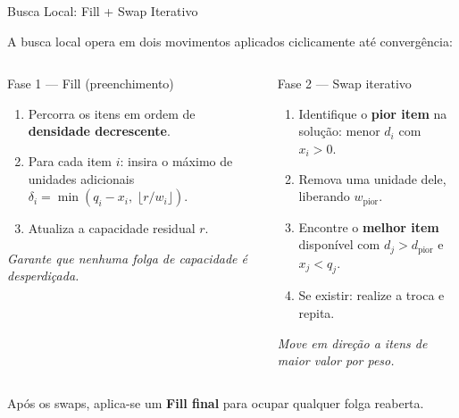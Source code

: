 \documentclass[aspectratio=169]{beamer}
\begin{document}
\begin{frame}{Busca Local: Fill + Swap Iterativo}

  A busca local opera em dois movimentos aplicados ciclicamente até convergência:

  \vspace{0.5em}
  \begin{columns}[T]
      \begin{block}{Fase 1 — Fill (preenchimento)}
        \begin{enumerate}
          \item Percorra os itens em ordem de \textbf{densidade decrescente}.
          \item Para cada item $i$: insira o máximo de unidades adicionais
                $\delta_i = \min(q_i - x_i,\; \lfloor r/w_i \rfloor)$.
          \item Atualiza a capacidade residual $r$.
        \end{enumerate}
        \vspace{0.2em}
        \emph{Garante que nenhuma folga de capacidade é desperdiçada.}
      \end{block}

      \begin{block}{Fase 2 — Swap iterativo}
        \begin{enumerate}
          \item Identifique o \textbf{pior item} na solução: menor $d_i$ com $x_i > 0$.
          \item Remova uma unidade dele, liberando $w_{\text{pior}}$.
          \item Encontre o \textbf{melhor item} disponível com $d_j > d_{\text{pior}}$
                e $x_j < q_j$.
          \item Se existir: realize a troca e repita.
        \end{enumerate}
        \vspace{0.2em}
        \emph{Move em direção a itens de maior valor por peso.}
      \end{block}
  \end{columns}

  \vspace{0.5em}
  Após os swaps, aplica-se um \textbf{Fill final} para ocupar qualquer folga reaberta.

\end{frame}
\end{document}
